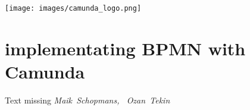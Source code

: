 \hfill\texttt{[image: images/camunda\_logo.png]}
\section*{implementating BPMN with Camunda}

Text missing 
\hfill\textit{Maik~Schopmans, ~Ozan~Tekin}
